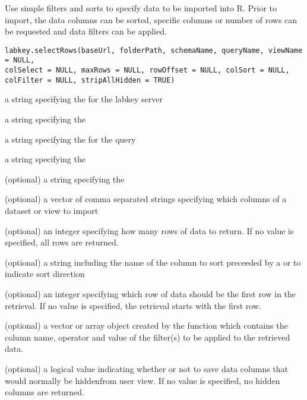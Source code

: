 \documentclass{article}
\begin{document}
\begin{Description}\relax
Use simple filters and sorts to specify data to be imported into R. Prior to import, 
the data columns can be sorted, specific columns or number of rows can be requested and
data filters can be applied.
\end{Description}
\begin{Usage}
\begin{verbatim}
labkey.selectRows(baseUrl, folderPath, schemaName, queryName, viewName = NULL, 
colSelect = NULL, maxRows = NULL, rowOffset = NULL, colSort = NULL, 
colFilter = NULL, stripAllHidden = TRUE)
\end{verbatim}
\end{Usage}
\begin{Arguments}
\begin{ldescription}
\item[\code{baseUrl}] a string specifying the for the labkey server
\item[\code{folderPath}] a string specifying the  
\item[\code{schemaName}] a string specifying the   for the query
\item[\code{queryName}] a string specifying the 
\item[\code{viewName}] (optional) a string specifying the 
\item[\code{colSelect}] (optional) a vector of comma separated strings specifying which columns of a dataset or view to import
\item[\code{maxRows}] (optional) an integer specifying how many rows of data to return. If no value is specified, all rows are returned.
\item[\code{colSort}] (optional) a string including the name of the column to sort preceeded by a \dQuote{+} or
\dQuote{-} to indicate sort direction
\item[\code{rowOffset}] (optional) an integer specifying which row of data should be the first row in the retrieval. If no
value is specified, the retrieval starts with the first row.
\item[\code{colFilter}] (optional) a vector or array object created by the  function which contains the
column name, operator and value of the filter(s) to be applied to the retrieved data.
\item[\code{stripAllHidden}] (optional) a logical value indicating whether or not to save data columns that would normally be hiddenfrom user view. If no value is specified, no hidden columns are returned.
\end{ldescription}
\end{Arguments}
\end{document}
